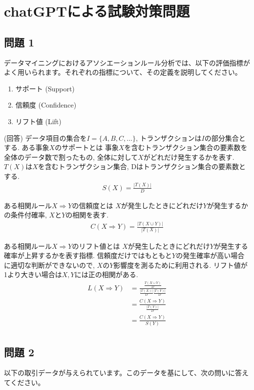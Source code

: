 \documentclass[dvipdfmx, 10pt]{jsarticle}
\begin{document}
\section*{chatGPTによる試験対策問題}
\subsection*{問題 1}
データマイニングにおけるアソシエーションルール分析では、以下の評価指標がよく用いられます。それぞれの指標について、その定義を説明してください。

\begin{enumerate}
    \item サポート (Support)
    \item 信頼度 (Confidence)
    \item リフト値 (Lift)
\end{enumerate}

(回答)
データ項目の集合を\(I = \{A, B, C, \dots \}\), トランザクションは\(I\)の部分集合とする. 
ある事象\(X\)のサポートとは
事象\(X\)を含むトランザクション集合の要素数を全体のデータ数で割ったもの, 全体に対して\(X\)がどれだけ発生するかを表す. 
\(T(X)\)は\(X\)を含むトランザクション集合, Dはトランザクション集合の要素数とする. 
\begin{align*}
    S(X) = \frac{|T(X)|}{D}
\end{align*}

ある相関ルール\(X \Rightarrow Y\)の信頼度とは
\(X\)が発生したときにどれだけ\(Y\)が発生するかの条件付確率, \(X\)と\(Y\)の相関を表す. 
\begin{align*}
    C(X \Rightarrow Y) = \frac{|T(X \cup Y)|}{|T(X)|}
\end{align*}

ある相関ルール\(X \Rightarrow Y\)のリフト値とは
\(X\)が発生したときにどれだけ\(Y\)が発生する確率が上昇するかを表す指標. 
信頼度だけではもともと\(Y\)の発生確率が高い場合に適切な判断ができないので, \(X\)の\(Y\)影響度を測るために利用される. 
リフト値が1より大きい場合は\(X, Y\)には正の相関がある. 
\begin{align*}
    L(X \Rightarrow Y) 
    &= \frac{\frac{T(X \cup Y)}{D}}{\frac{|T(X)|}{D} \frac{|T(Y)|}{D}} \\
    &= \frac{C(X \Rightarrow Y)}{\frac{|T(Y)|}{D}} \\
    &= \frac{C(X \Rightarrow Y)}{S(Y)} \\
\end{align*}

\subsection*{問題 2}
以下の取引データが与えられています。このデータを基にして、次の問いに答えてください。
\end{document}

